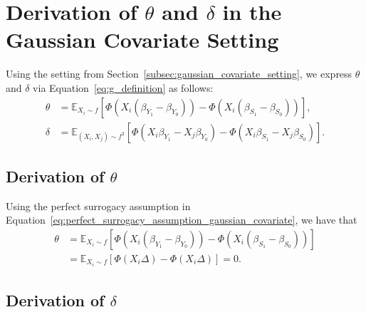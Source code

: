 \documentclass[referee,usenatbib]{biom}
\newcommand{\E}{\mathbb{E}}
\begin{document}
\section{Derivation of \texorpdfstring{\(\theta\)}{theta} and \texorpdfstring{\(\delta\)}{delta} in the Gaussian Covariate Setting}
\label{app:gaussian_covariate_derivation}

Using the setting from Section~\ref{subsec:gaussian_covariate_setting}, we express \(\theta\) and \(\delta\) via Equation~\eqref{eq:g_definition} as follows:
\begin{align*}
    \theta & = \E_{X_{i} \sim f} \!\left[ \Phi \left( X_{i} (\beta_{Y_{1}} - \beta_{Y_{0}}) \right) - \Phi \left( X_{i} (\beta_{S_{1}} - \beta_{S_{0}}) \right) \right], \\
    \delta & = \E_{(X_{i}, X_{j}) \sim f^{2}} \!\left[ \Phi \left( X_{i} \beta_{Y_{1}} - X_{j} \beta_{Y_{0}} \right) - \Phi \left( X_{i} \beta_{S_{1}} - X_{j} \beta_{S_{0}} \right) \right].
\end{align*}

\subsection{Derivation of \texorpdfstring{\(\theta\)}{theta}}
\label{app:derivation_theta_gaussian_covariate}

Using the perfect surrogacy assumption in Equation~\eqref{eq:perfect_surrogacy_assumption_gaussian_covariate}, we have that
\begin{align*}
    \theta & = \E_{X_{i} \sim f} \!\left[ \Phi \left( X_{i} (\beta_{Y_{1}} - \beta_{Y_{0}}) \right) - \Phi \left( X_{i} (\beta_{S_{1}} - \beta_{S_{0}}) \right) \right] \\
    & = \E_{X_{i} \sim f} \!\left[ \Phi \left( X_{i} \Delta \right) - \Phi \left( X_{i} \Delta \right) \right] = 0.
\end{align*}

\subsection{Derivation of \texorpdfstring{\(\delta\)}{delta}}
\label{app:derivation_delta_gaussian_covariate}
\end{document}
